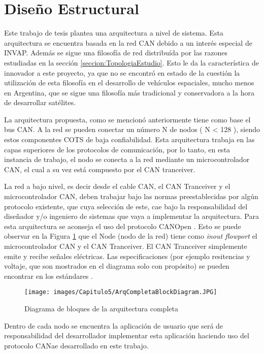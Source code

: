 \section{Diseño Estructural}\label{sec:dis_estructural}
Este trabajo de tesis plantea una arquitectura a nivel de sistema.
Esta arquitectura se encuentra basada en la red CAN debido a
un interés especial de INVAP. Además se sigue una filosofía de red
distribuída por las razones estudiadas en la sección
\ref{seccion:TopologiaEstudio}. Esto le da la característica de innovador
a este proyecto, ya que no se encontró en estado de la cuestión
la utilización de esta filosofía en el desarrollo de vehículos
espaciales, mucho menos en Argentina, que se sigue una filosofía
más tradicional y conservadora a la hora de desarrollar satélites. 

La arquitectura propuesta, como se mencionó anteriormente tiene como
base el bus CAN. A la red se pueden conectar un número N de
nodos ( N < 128 ), siendo estos componentes COTS de baja confiabilidad. 
Esta arquitectura trabaja en las capas superiores 
de los protocolos de comunicación, por lo tanto, en esta instancia 
de trabajo, el nodo se conecta a la red mediante un microcontrolador 
CAN, el cual a su vez está compuesto por el CAN tranceiver.

La red a bajo nivel, es decir desde el cable CAN, el CAN Tranceiver y 
el microcontrolador CAN, deben trabajar bajo las normas preestablecidas
por algún protocolo existente, que cuya selección de este, cae bajo la 
responsabilidad del diseñador y/o ingeniero de sistemas que vaya 
a implementar la arquitectura. Para esta arquitectura se aconseja el uso
del protocolo CANOpen \citep{can-ciaWEB}. Esto se puede observar en la
 Figura \ref{fig:DiagramaEstructuraCompleta} que el Node (nodo de la red)
tiene como \textit{inout flowport} el microcontrolador CAN  y el
CAN Tranceiver. El CAN Tranceiver simplemente emite y recibe señales eléctricas. Las 
especificaciones (por ejemplo resitencias y voltaje, que son mostrados en el diagrama
solo con propósito) se pueden encontrar en los estándares \citep{can-ciaWEB}.

\begin{figure}[h!]
 \centering
 \texttt{[image: images/Capitulo5/ArqCompletaBlockDiagram.JPG]}
  \caption{Diagrama de bloques de la arquitectura completa}
\label{fig:DiagramaEstructuraCompleta}
\end{figure} 

Dentro de cada nodo se encuentra la aplicación de usuario que será de 
responsabilidad del desarrollador implementar esta aplicación haciendo uso
del protocolo CANae desarrollado en este trabajo.

